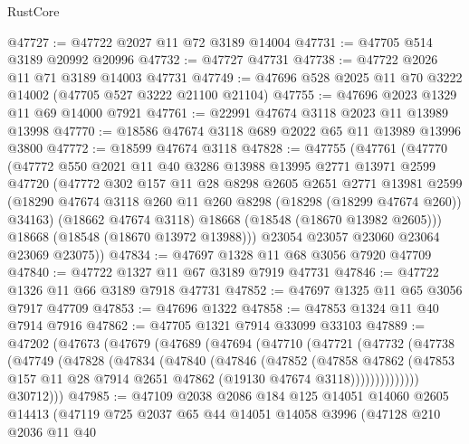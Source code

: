 \begin{lexlean}{RustCore}
\begin{coremodule}
@47727 := @47722 @2027 @11 @72 @3189 @14004
@47731 := @47705 @514 @3189 @20992 @20996
@47732 := @47727 @47731
@47738 := @47722 @2026 @11 @71 @3189 @14003 @47731
@47749 := @47696 @528 @2025 @11 @70 @3222 @14002 (@47705 @527 @3222 @21100 @21104)
@47755 := @47696 @2023 @1329 @11 @69 @14000 @7921
@47761 := @22991 @47674 @3118 @2023 @11 @13989 @13998
@47770 := @18586 @47674 @3118 @689 @2022 @65 @11 @13989 @13996 @3800
@47772 := @18599 @47674 @3118
@47828 := @47755
    (@47761
      (@47770
        (@47772
          @550
          @2021
          @11
          @40
          @3286
          @13988
          @13995
          @2771
          @13971
          @2599
          @47720
          (@47772
            @302
            @157
            @11
            @28
            @8298
            @2605
            @2651
            @2771
            @13981
            @2599
            (@18290 @47674 @3118 @260 @11 @260 @8298 (@18298 (@18299 @47674 @260)) @34163)
            (@18662 @47674 @3118)
            @18668
            (@18548 (@18670 @13982 @2605)))
          @18668
          (@18548 (@18670 @13972 @13988)))
        @23054
        @23057
        @23060
        @23064
        @23069
        @23075))
@47834 := @47697 @1328 @11 @68 @3056 @7920 @47709
@47840 := @47722 @1327 @11 @67 @3189 @7919 @47731
@47846 := @47722 @1326 @11 @66 @3189 @7918 @47731
@47852 := @47697 @1325 @11 @65 @3056 @7917 @47709
@47853 := @47696 @1322
@47858 := @47853 @1324 @11 @40 @7914 @7916
@47862 := @47705 @1321 @7914 @33099 @33103
@47889 := @47202
    (@47673
      (@47679
        (@47689
          (@47694
            (@47710
              (@47721
                (@47732
                  (@47738
                    (@47749
                      (@47828
                        (@47834
                          (@47840
                            (@47846
                              (@47852
                                (@47858
                                  @47862
                                  (@47853
                                    @157
                                    @11
                                    @28
                                    @7914
                                    @2651
                                    @47862
                                    (@19130 @47674 @3118))))))))))))))
          @30712)))
@47985 := @47109
    @2038
    @2086
    @184
    @125
    @14051
    @14060
    @2605
    @14413
    (@47119
      @725
      @2037
      @65
      @44
      @14051
      @14058
      @3996
      (@47128
        @210
        @2036
        @11
        @40

\end{coremodule}
\end{lexlean}
